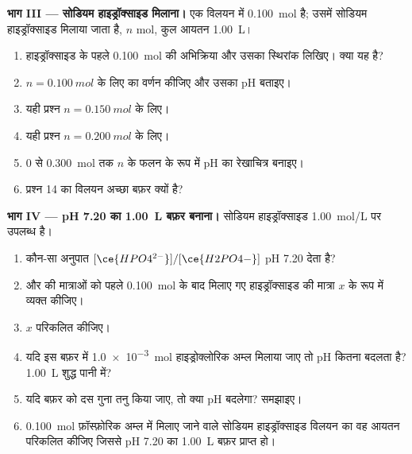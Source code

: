 \begin{problem}
\medskip
\noindent\textbf{भाग III --- सोडियम हाइड्रॉक्साइड मिलाना।}
एक विलयन में \qty{0.100}{mol}  है; उसमें सोडियम हाइड्रॉक्साइड
मिलाया जाता है, $n$ mol, कुल आयतन \qty{1.00}{L}।
\begin{enumerate}[resume]
  \item हाइड्रॉक्साइड के पहले \qty{0.100}{mol} की अभिक्रिया और
        उसका स्थिरांक लिखिए। क्या यह  है?
  \item $n = \qty{0.100}{mol}$ के लिए  का वर्णन कीजिए और
        उसका pH बताइए।
  \item यही प्रश्न $n = \qty{0.150}{mol}$ के लिए।
  \item यही प्रश्न $n = \qty{0.200}{mol}$ के लिए।
  \item 0 से \qty{0.300}{mol} तक $n$ के फलन के रूप में pH का रेखाचित्र बनाइए।
  \item प्रश्न 14 का विलयन अच्छा बफ़र क्यों है?
\end{enumerate}

\medskip
\noindent\textbf{भाग IV --- pH 7.20 का \qty{1.00}{L} बफ़र बनाना।}
सोडियम हाइड्रॉक्साइड \qty{1.00}{mol/L} पर उपलब्ध है।
\begin{enumerate}[resume]
  \item कौन-सा अनुपात $[\ce{HPO4^{2-}}]/[\ce{H2PO4-}]$ pH 7.20 देता है?
  \item {} और  की मात्राओं को पहले \qty{0.100}{mol}
        के बाद मिलाए गए हाइड्रॉक्साइड की मात्रा $x$ के रूप में व्यक्त कीजिए।
  \item $x$ परिकलित कीजिए।
  \item यदि इस बफ़र में \qty{1.0e-3}{mol} हाइड्रोक्लोरिक
        अम्ल मिलाया जाए तो pH कितना बदलता है? \qty{1.00}{L} शुद्ध पानी में?
  \item यदि बफ़र को दस गुना तनु किया जाए, तो क्या pH बदलेगा? समझाइए।
  \item \qty{0.100}{mol} फ़ॉस्फ़ोरिक अम्ल में मिलाए जाने वाले सोडियम हाइड्रॉक्साइड विलयन
        का वह आयतन परिकलित कीजिए जिससे pH 7.20 का \qty{1.00}{L}
        बफ़र प्राप्त हो।
\end{enumerate}
\end{problem}
